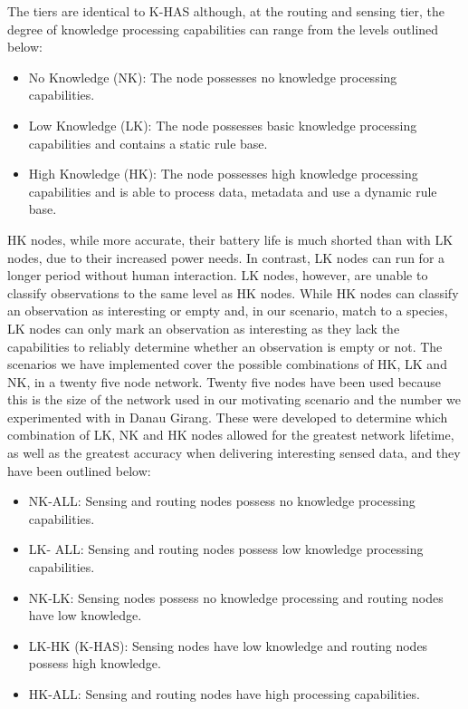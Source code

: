 	The tiers are identical to K-HAS although, at the routing and sensing tier, the degree of knowledge processing capabilities can range from the levels outlined below:
	
	\begin{itemize}
		\item No Knowledge (NK): The node possesses no knowledge processing capabilities.
		\item Low Knowledge (LK): The node possesses basic knowledge processing capabilities and contains a static rule base.
		\item High Knowledge (HK): The node possesses high knowledge processing capabilities and is able to process data, metadata and use a dynamic rule base.
	\end{itemize}
	
	HK nodes, while more accurate, their battery life is much shorted than with LK nodes, due to their increased power needs. In contrast, LK nodes can run for a longer period without human interaction. LK nodes, however, are unable to classify observations to the same level as HK nodes. While HK nodes can classify an observation as interesting or empty and, in our scenario, match to a species, LK nodes can only mark an observation as interesting as they lack the capabilities to reliably determine whether an observation is empty or not. The scenarios we have implemented cover the possible combinations of HK, LK and NK, in a twenty five node network. Twenty five nodes have been used because this is the size of the network used in our motivating scenario and the number we experimented with in Danau Girang. These were developed to determine which combination of LK, NK and HK nodes allowed for the greatest network lifetime, as well as the greatest accuracy when delivering interesting sensed data, and they have been outlined below:
	
	\begin{itemize}
		\item NK-ALL: Sensing and routing nodes possess no knowledge processing capabilities.
		\item LK- ALL: Sensing and routing nodes possess low knowledge processing capabilities.
		\item NK-LK: Sensing nodes possess no knowledge processing and routing nodes have low knowledge.
		\item LK-HK (K-HAS): Sensing nodes have low knowledge and routing nodes possess high knowledge.
		\item HK-ALL: Sensing and routing nodes have high processing capabilities.
	\end{itemize}

